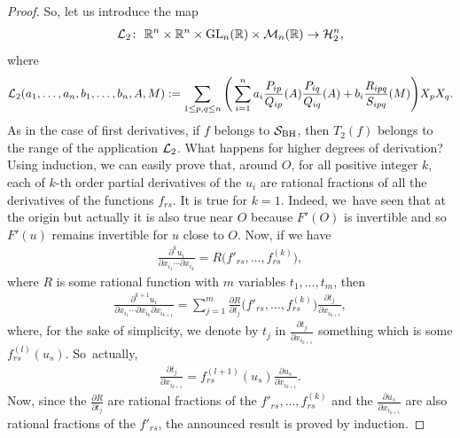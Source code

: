 \documentclass[pdftex]{sigma}%
\numberwithin{equation}{section}
\begin{document}
\begin{proof}
	So, let us introduce the map
\begin{gather*}
{\cal L}_2\colon\ \mathbb{R}^n\times\mathbb{R}^n\times {\rm GL}_n(\mathbb{R})\times {\cal M}_n(\mathbb{R})\to{\cal H}_2^n,
\end{gather*}
where
\begin{gather*}
{\cal L}_2(a_1, \dots, a_n, b_1, \dots, b_n, A,M):=\sum_{1\leq p,q\leq n}\Bigg(\sum_{i=1}^{n}a_i\frac{P_{ip}}{Q_{ip}}(A)\frac{P_{iq}}{Q_{iq}}(A) +b_i\frac{R_{ipq}}{S_{ipq}}(M)\Bigg)X_pX_q.
\end{gather*}
	As in the case of first derivatives, if $f$ belongs to ${\cal S}_{\rm BH}$, then $T_2(f)$ belongs to the range of the application ${\cal L}_2$.
	What happens for higher degrees of derivation? Using induction, we can easily prove that, around $O$, for all positive integer $k$, each of $k$-th order partial derivatives of the $u_i$ are rational fractions of all the derivatives of the functions $f_{rs}$. It is true for $k=1$. Indeed, we~have seen that at the origin but actually it is also true near $O$ because $F'(O)$ is invertible and so $F'(u)$ remains invertible for $u$ close to $O$. Now, if we have
\begin{gather*}
\frac{\partial^ku_i}{\partial x_{i_1}\cdots\partial{x_{i_k}}}=R\big(f'_{rs},\dots,f^{(k)}_{rs}\big),
\end{gather*}
where $R$ is some rational function with $m$ variables $t_1,\dots,t_m$, then
\begin{gather*}
\frac{\partial^{k+1}u_i}{\partial x_{i_1}\cdots\partial{x_{i_k}}\partial{x_{i_{k+1}}}}=\sum_{j=1}^m\frac{\partial R}{\partial t_j}\big(f'_{rs},\dots,f^{(k)}_{rs}\big)\frac{\partial t_j}{\partial x_{i_{k+1}}},
\end{gather*}
where, for the sake of simplicity, we denote by $t_j$ in $\frac{\partial t_j}{\partial x_{i_{k+1}}}$ something which is some $f^{(l)}_{rs}(u_s)$. So~actually,
\begin{gather*}
\frac{\partial t_j}{\partial x_{i_{k+1}}}=f^{(l+1)}_{rs}(u_s)\frac{\partial u_s}{\partial x_{i_{k+1}}}.
\end{gather*}
	Now, since the $\frac{\partial R}{\partial t_j}$ are rational fractions of the $f'_{rs},\dots,f^{(k)}_{rs}$ and the $\frac{\partial u_s}{\partial x_{i_{k+1}}}$ are also rational fractions of the $f'_{rs}$, the announced result is proved by induction.
	

\end{proof}
\end{document}

